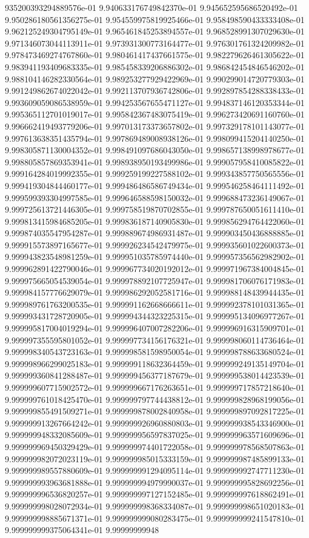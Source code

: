935200393294889576e-01	9.940633176749842370e-01	9.945652595686520492e-01	9.950286180561356275e-01	9.954559975819925466e-01	9.958498590433333408e-01	9.962125249304795149e-01	9.965461845253894557e-01	9.968528991307029630e-01	9.971346073044113911e-01	9.973931300773164477e-01	9.976301761324209982e-01	9.978473469274767860e-01	9.980461417437661575e-01	9.982279626461305622e-01	9.983941193409683335e-01	9.985458339206886302e-01	9.986842454846546202e-01	9.988104146282330564e-01	9.989253277929422969e-01	9.990299014720779303e-01	9.991249862674022042e-01	9.992113707936742806e-01	9.992897854288338433e-01	9.993609059086538959e-01	9.994253567655471127e-01	9.994837146120353344e-01	9.995365112701019017e-01	9.995842367483075419e-01	9.996273420691160760e-01	9.996662419493779206e-01	9.997013173373657802e-01	9.997329178101143077e-01	9.997613638351435794e-01	9.997869489008938126e-01	9.998099415204140250e-01	9.998305871130004352e-01	9.998491097686043050e-01	9.998657138998978677e-01	9.998805857869353941e-01	9.998938950193499986e-01	9.999057958410085822e-01	9.999164284019992355e-01	9.999259199227588102e-01	9.999343857750565556e-01	9.999419304844460177e-01	9.999486486586749434e-01	9.999546258464111492e-01	9.999599393304997585e-01	9.999646588598150032e-01	9.999688473236149067e-01	9.999725613721446305e-01	9.999758519870702855e-01	9.999787650051611410e-01	9.999813415984685205e-01	9.999836187140905830e-01	9.999856294764422060e-01	9.999874035547954287e-01	9.999889674986931487e-01	9.999903450436888885e-01	9.999915573897165677e-01	9.999926234542479975e-01	9.999935601022600373e-01	9.999943823548981259e-01	9.999951035785974440e-01	9.999957356562982902e-01	9.999962891422790046e-01	9.999967734020192012e-01	9.999971967384004845e-01	9.999975665054539054e-01	9.999978892107725947e-01	9.999981706076171983e-01	9.999984157776629079e-01	9.999986292052581716e-01	9.999988148439944435e-01	9.999989761763200535e-01	9.999991162668666611e-01	9.999992378101031365e-01	9.999993431728720905e-01	9.999994344323225315e-01	9.999995134096977267e-01	9.999995817004019294e-01	9.999996407007282206e-01	9.999996916315909701e-01	9.999997355595801052e-01	9.999997734156176321e-01	9.999998060114736464e-01	9.999998340543723163e-01	9.999998581598950054e-01	9.999998788633680524e-01	9.999998966299025183e-01	9.999999118632364459e-01	9.999999249135149704e-01	9.999999360841288487e-01	9.999999456377187679e-01	9.999999538014423539e-01	9.999999607715902572e-01	9.999999667176263651e-01	9.999999717857218640e-01	9.999999761018425470e-01	9.999999797744438812e-01	9.999999828968199056e-01	9.999999855491509271e-01	9.999999878002840958e-01	9.999999897092817225e-01	9.999999913267664242e-01	9.999999926960880803e-01	9.999999938543346900e-01	9.999999948332085609e-01	9.999999956597837025e-01	9.999999963571609696e-01	9.999999969450329429e-01	9.999999974401722058e-01	9.999999978568507863e-01	9.999999982072023119e-01	9.999999985015333159e-01	9.999999987485899133e-01	9.999999989557880609e-01	9.999999991294095114e-01	9.999999992747711230e-01	9.999999993963681888e-01	9.999999994979990037e-01	9.999999995828692256e-01	9.999999996536820257e-01	9.999999997127152485e-01	9.999999997618862491e-01	9.999999998028072934e-01	9.999999998368334087e-01	9.999999998651020183e-01	9.999999998885671371e-01	9.999999999080283475e-01	9.999999999241547810e-01	9.999999999375064341e-01	9.99999999948